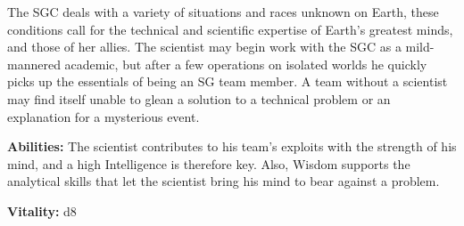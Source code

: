 \begin{multicols}{2}

The SGC deals with a variety of situations and races unknown on Earth, these conditions call for the technical and scientific expertise of Earth's greatest minds, and those of her allies. The scientist may begin work with the SGC as a mild-mannered academic, but after a few operations on isolated worlds he quickly picks up the essentials of being an SG team member. A team without a scientist may find itself unable to glean a solution to a technical problem or an explanation for a mysterious event.

\columnbreak

\textbf{Abilities:} The scientist contributes to his team's exploits with the strength of his mind, and a high Intelligence is therefore key. Also, Wisdom supports the analytical skills that let the scientist bring his mind to bear against a problem.


\textbf{Vitality:} d8

\end{multicols}

